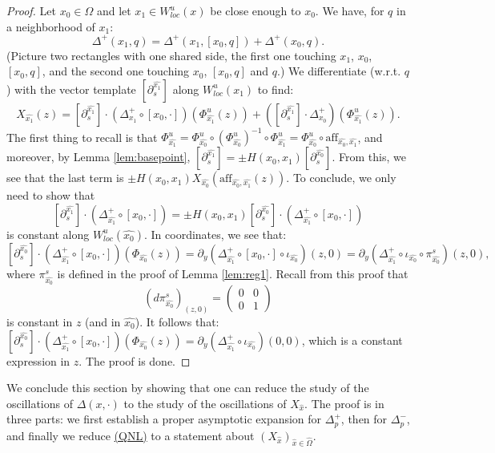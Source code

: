 \documentclass[a4paper]{article}
\theoremstyle{definition}
\begin{document}
\begin{proof}
Let $x_0 \in \Omega$ and let $x_1 \in W^u_{loc}(x)$ be close enough to $x_0$. We have, for $q$ in a neighborhood of $x_1$:
$$ \Delta^+( x_1, q ) = \Delta^+( x_1, [x_0,q] ) + \Delta^+(x_0,q). $$
(Picture two rectangles with one shared side, the first one touching $x_1$, $x_0$, $[x_0,q]$, and the second one touching $x_0$, $[x_0,q]$ and $q$.) We differentiate (w.r.t. $q$) with the vector template $[\partial_s^{\widehat{x_1}}]$ along $W^u_{loc}(x_1)$ to find:
$$ X_{\widehat{x_1}}(z) = [\partial_s^ {\widehat{x_1}}] \cdot (\Delta_{x_1}^+ \circ [x_0,\cdot])(\Phi_{{\widehat{x_1}}}^u(z)) + ([\partial_s^{{\widehat{x_1}}}] \cdot \Delta_{x_0}^+)(\Phi_{{\widehat{x_1}}}^u(z)) .$$
The first thing to recall is that $\Phi_{{\widehat{x_1}}}^u = \Phi_{\widehat{x_0}}^u \circ (\Phi_{\widehat{x_0}}^{u})^{-1} \circ \Phi_{{\widehat{x_1}}}^u = \Phi_{\widehat{x_0}}^u \circ \text{aff}_{{\widehat{x_0}},{\widehat{x_1}}} $, and moreover, by Lemma \ref{lem:basepoint}, $[\partial_s^{{\widehat{x_1}}}] = \pm H(x_0,x_1) [\partial_s^{\widehat{x_0}}]$. From this, we see that the last term is $\pm H(x_0,x_1) X_{\widehat{x_0}}(\text{aff}_{{\widehat{x_0}},{\widehat{x_1}}}(z))$. To conclude, we only need to show that
$$ [\partial_s^ {{\widehat{x_1}}}] \cdot (\Delta_{{\widehat{x_1}}}^+ \circ [x_0,\cdot]) = \pm H(x_0,x_1) [\partial_s^{{\widehat{x_0}}}] \cdot (\Delta_{{\widehat{x_1}}}^+ \circ [x_0,\cdot])  $$
is constant along $W^u_{loc}({\widehat{x_0}})$. In coordinates, we see that:
$$ [\partial_s^{{\widehat{x_0}}}] \cdot (\Delta_{{\widehat{x_1}}}^+ \circ [x_0,\cdot])(\Phi_{\widehat{x_0}}(z))  = \partial_y (\Delta_{{\widehat{x_1}}}^+ \circ [x_0,\cdot] \circ \iota_{\widehat{x_0}})(z,0) = \partial_y( \Delta_{{\widehat{x_1}}}^+ \circ \iota_{\widehat{x_0}} \circ \pi_{\widehat{x_0}}^s)(z,0), $$
where $\pi_{\widehat{x_0}}^s$ is defined in the proof of Lemma \ref{lem:reg1}. Recall from this proof that
$$ (d\pi_{\widehat{x_0}}^s)_{(z,0)} = \begin{pmatrix} 0 & 0 \\ 0 & 1 \end{pmatrix} $$
is constant in $z$ (and in ${\widehat{x_0}}$).
It follows that:
$[\partial_s^{{\widehat{x_0}}}] \cdot (\Delta_{{\widehat{x_1}}}^+ \circ [x_0,\cdot])(\Phi_{\widehat{x_0}}(z)) = \partial_y(\Delta_{{\widehat{x_1}}}^+ \circ \iota_{\widehat{x_0}})(0,0) $, which is a constant expression in $z$. The proof is done.
\end{proof}

We conclude this section by showing that one can reduce the study of the oscillations of $\Delta(x,\cdot)$ to the study of the oscillations of $X_{\widehat{x}}$. The proof is in three parts: we first establish a proper asymptotic expansion for $\Delta_p^+$, then for $\Delta^-_p$, and finally we reduce \hyperref[QNL]{(QNL)}  to a  statement about $(X_{\widehat{x}})_{{\widehat{x}} \in \widehat{\Omega}}$. 
\end{document}
